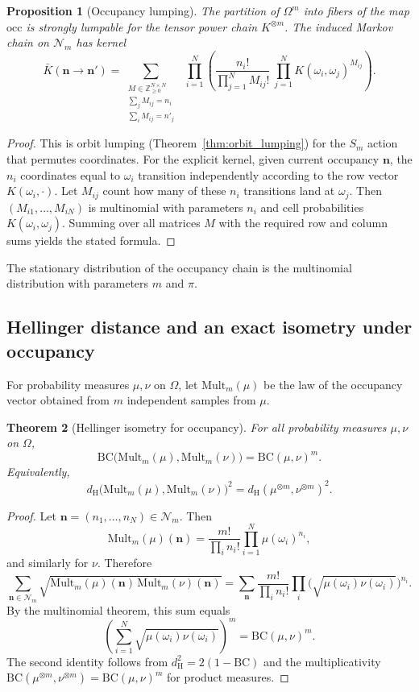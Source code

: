 \documentclass[final,3p,times]{elsarticle}
\newtheorem{theorem}{Theorem}[section]
\newtheorem{proposition}[theorem]{Proposition}
\theoremstyle{definition}
\newcommand{\HH}{d_{\mathrm{H}}}
\newcommand{\BC}{\mathrm{BC}}
\begin{document}
\begin{proposition}[Occupancy lumping]\label{prop:occupancy_lumping}
The partition of $\Omega^m$ into fibers of the map $\mathrm{occ}$ is strongly lumpable for the tensor power chain $K^{\otimes m}$.
The induced Markov chain on $\mathcal{N}_m$ has kernel
\[
\bar K(\mathbf{n}\to \mathbf{n}')
=
\sum_{\substack{M\in\mathbb{Z}_{\ge0}^{N\times N}\\
\sum_j M_{ij}=n_i\\
\sum_i M_{ij}=n'_j}}
\ \ \prod_{i=1}^N
\left(
\frac{n_i!}{\prod_{j=1}^N M_{ij}!}\ \prod_{j=1}^N K(\omega_i,\omega_j)^{M_{ij}}
\right).
\]
\end{proposition}

\begin{proof}
This is orbit lumping (Theorem~\ref{thm:orbit_lumping}) for the $S_m$ action that permutes coordinates.
For the explicit kernel, given current occupancy $\mathbf{n}$, the $n_i$ coordinates equal to $\omega_i$ transition independently according to the row vector $K(\omega_i,\cdot)$.
Let $M_{ij}$ count how many of these $n_i$ transitions land at $\omega_j$.
Then $(M_{i1},\dots,M_{iN})$ is multinomial with parameters $n_i$ and cell probabilities $K(\omega_i,\omega_j)$.
Summing over all matrices $M$ with the required row and column sums yields the stated formula.
\end{proof}

The stationary distribution of the occupancy chain is the multinomial distribution with parameters $m$ and $\pi$.

\subsection{Hellinger distance and an exact isometry under occupancy}

For probability measures $\mu,\nu$ on $\Omega$, let $\mathrm{Mult}_m(\mu)$ be the law of the occupancy vector obtained from $m$ independent samples from $\mu$.

\begin{theorem}[Hellinger isometry for occupancy]\label{thm:hellinger_isometry}
For all probability measures $\mu,\nu$ on $\Omega$,
\[
\BC\bigl(\mathrm{Mult}_m(\mu),\mathrm{Mult}_m(\nu)\bigr)
=
\BC(\mu,\nu)^m.
\]
Equivalently,
\[
\HH\bigl(\mathrm{Mult}_m(\mu),\mathrm{Mult}_m(\nu)\bigr)^2
=
\HH(\mu^{\otimes m},\nu^{\otimes m})^2.
\]
\end{theorem}

\begin{proof}
Let $\mathbf{n}=(n_1,\dots,n_N)\in\mathcal{N}_m$.
Then
\[
\mathrm{Mult}_m(\mu)(\mathbf{n}) = \frac{m!}{\prod_i n_i!}\prod_{i=1}^N \mu(\omega_i)^{n_i},
\]
and similarly for $\nu$.
Therefore
\[
\sum_{\mathbf{n}\in\mathcal{N}_m}\sqrt{\mathrm{Mult}_m(\mu)(\mathbf{n})\,\mathrm{Mult}_m(\nu)(\mathbf{n})}
=
\sum_{\mathbf{n}}\frac{m!}{\prod_i n_i!}\prod_i \bigl(\sqrt{\mu(\omega_i)\nu(\omega_i)}\bigr)^{n_i}.
\]
By the multinomial theorem, this sum equals
\[
\left(\sum_{i=1}^N \sqrt{\mu(\omega_i)\nu(\omega_i)}\right)^m = \BC(\mu,\nu)^m.
\]
The second identity follows from $\HH^2=2(1-\BC)$ and the multiplicativity $\BC(\mu^{\otimes m},\nu^{\otimes m})=\BC(\mu,\nu)^m$ for product measures.
\end{proof}
\end{document}
